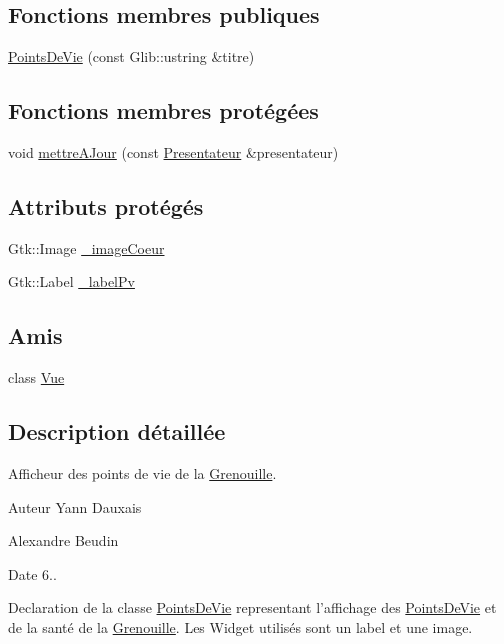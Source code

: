 \subsection*{Fonctions membres publiques}
\begin{DoxyCompactItemize}
\item 
\hyperlink{classgrenouilloland_1_1PointsDeVie_a2e7343a93c85f829b632882f015cd683}{Points\-De\-Vie} (const Glib\-::ustring \&titre)
\end{DoxyCompactItemize}
\subsection*{Fonctions membres protégées}
\begin{DoxyCompactItemize}
\item 
void \hyperlink{classgrenouilloland_1_1PointsDeVie_a6fdc129a1d93e85ffae0f0ab948ce2ae}{mettre\-A\-Jour} (const \hyperlink{classgrenouilloland_1_1Presentateur}{Presentateur} \&presentateur)
\end{DoxyCompactItemize}
\subsection*{Attributs protégés}
\begin{DoxyCompactItemize}
\item 
Gtk\-::\-Image \hyperlink{classgrenouilloland_1_1PointsDeVie_a154df2e799b244ec1d0374af4297eb5d}{\-\_\-image\-Coeur}
\item 
Gtk\-::\-Label \hyperlink{classgrenouilloland_1_1PointsDeVie_a6b7f96b9a6eca2629c76ef30598c7b7b}{\-\_\-label\-Pv}
\end{DoxyCompactItemize}
\subsection*{Amis}
\begin{DoxyCompactItemize}
\item 
class \hyperlink{classgrenouilloland_1_1PointsDeVie_adc3b1810b8d3988a7832f57c330fe4fd}{Vue}
\end{DoxyCompactItemize}


\subsection{Description détaillée}
Afficheur des points de vie de la \hyperlink{classgrenouilloland_1_1Grenouille}{Grenouille}. 

\begin{DoxyAuthor}{Auteur}
Yann Dauxais 

Alexandre Beudin 
\end{DoxyAuthor}
\begin{DoxyDate}{Date}
6..
\end{DoxyDate}
Declaration de la classe \hyperlink{classgrenouilloland_1_1PointsDeVie}{Points\-De\-Vie} representant l'affichage des \hyperlink{classgrenouilloland_1_1PointsDeVie}{Points\-De\-Vie} et de la santé de la \hyperlink{classgrenouilloland_1_1Grenouille}{Grenouille}. Les Widget utilisés sont un label et une image.

